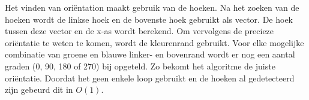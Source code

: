 Het vinden van oriëntation maakt gebruik van de hoeken. Na het zoeken van de hoeken wordt de linkse hoek en de bovenste hoek gebruikt als vector. De hoek tussen deze vector en de x-as wordt berekend. Om vervolgens de precieze oriëntatie te weten te komen, wordt de kleurenrand gebruikt. Voor elke mogelijke combinatie van groene en blauwe linker- en bovenrand wordt er nog een aantal graden (0, 90, 180 of 270) bij opgeteld. Zo bekomt het algoritme de juiste oriëntatie. Doordat het geen enkele loop gebruikt en de hoeken al gedetecteerd zijn gebeurd dit in $O(1)$.